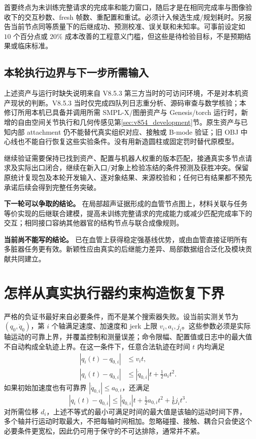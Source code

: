 \documentclass[11pt,a4paper,fontset=fandol]{ctexart}
\theoremstyle{definition}
\theoremstyle{remark}\newtheorem{remark}[theorem]{说明}
\numberwithin{equation}{section}
\begin{document}
首要终点为未训练完整请求的完成率和能力窗口，随后才是在相同完成率与图像验收下的交互秒数、fresh 帧数、重配置和重试。必须计入候选生成/规划耗时。另报告当前节点同等质量下的后继成功、预测校准、误关联和未知率。可事前设定如 $10$ 个百分点或 $20\%$ 成本改善的工程意义门槛，但这些是待检验目标，不是预期结果或临床标准。

\subsection{本轮执行边界与下一步所需输入}
上述资产与运行时缺失说明来自 V8.5.3 第三方当时的可访问环境，不是对本机资产现状的判断。V8.5.3 当时仅完成四队列日志重分析、源码审查与数学核验；本修订所用本机已具备并调用所需 SMPL-X/图册资产与 Genesis/torch 运行时，新增的自由空间关节执行和几何传感见第\ref{sec:v854_development}节。原生资产与已知内部 attachment 仍不能替代真实组织对应、接触或 B-mode 验证；旧 OBJ 中心线也不能自行恢复这些实验条件。没有用新造圆柱或固定罚时替代原模型。

继续验证需要保持已找到资产、配置与机器人权重的版本匹配，接通真实多节点请求及实际出口闭合，继续在新入口/对象上检验冻结的条件预测及获胜冲突。保留原统计复现包及本轮开发输入、逐对象结果、来源校验和；任何已有结果都不预先承诺后续会得到完整任务突破。

\begin{corebox}
\textbf{下一轮可以争取的结论。}
在局部超声证据形成的血管节点图上，材料关联与任务等价实现的后继联合建模，提高未训练完整请求的完成能力或减少匹配完成率下的交互；相同接口容纳其他器官的结构节点与联合成像规则。

\textbf{当前尚不能写的结论。}
已在血管上获得稳定强基线优势，或由血管直接证明所有多脏器任务更有效。新颖性应由真实的后继能力差异、局部数据组合泛化及模块贡献共同建立。
\end{corebox}


\appendix
\section{怎样从真实执行器约束构造恢复下界}
\label{app:physical}
严格的负证书最好来自必要条件，而不是某个搜索器失败。设当前实测关节为 $(q_0,\dot q_0)$，第 $i$ 个轴满足速度、加速度和 jerk 上限 $v_i,a_i,j_i$。这些参数必须是实际轴运动的可靠上界，并覆盖控制和测量误差；命令限幅、配置值或日志中的最大值不自动构成全轨迹上界。在这一条件下，任意合法轨迹在时间 $t$ 内均满足
\begin{align}
 |q_i(t)-q_{0,i}|&\le v_i t,\\
 |q_i(t)-q_{0,i}|&\le|\dot q_{0,i}|t+\tfrac12a_i t^2.
\end{align}
如果初始加速度也有可靠界 $|\ddot q_{0,i}|\le a_{0,i}$，还满足
\begin{equation}
 |q_i(t)-q_{0,i}|\le|\dot q_{0,i}|t+\tfrac12a_{0,i}t^2+\tfrac16j_i t^3.
\end{equation}
对所需位移 $d_i$，上述不等式的最小可满足时间的最大值是该轴的运动时间下界，多个轴并行运动时取最大，不把每轴时间相加。忽略碰撞、接触、耦合只会使这个必要条件更宽松，因此仍可用于保守的不可达排除，通常并不紧。
\end{document}
